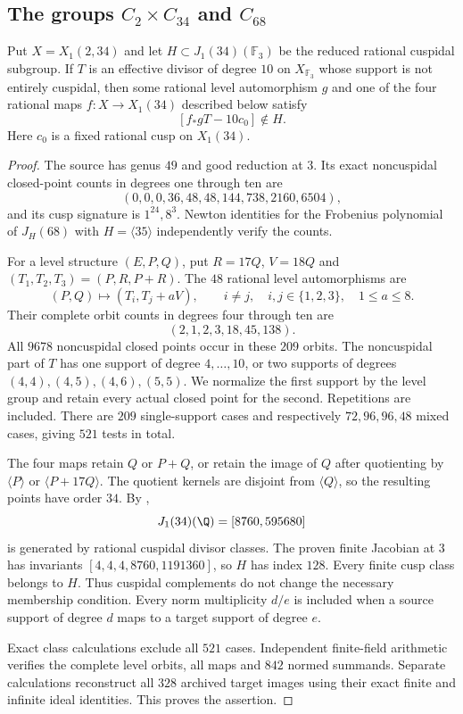 \subsection{The groups $C_2\times C_{34}$ and $C_{68}$}

\begin{lemma}\label{lem:decic234-finite-sieve}
Put $X=X_1(2,34)$ and let $H\subset J_1(34)(\mathbb F_3)$ be the
reduced rational cuspidal subgroup. If $T$ is an effective divisor
of degree $10$ on $X_{\mathbb F_3}$ whose support is not entirely cuspidal, then
some rational level automorphism $g$ and one of the four rational
maps $f:X\to X_1(34)$ described below satisfy
\[
 [f_*gT-10c_0]\notin H.
\]
Here $c_0$ is a fixed rational cusp on $X_1(34)$.
\end{lemma}
\begin{proof}
The source has genus $49$ and good reduction at $3$.
Its exact noncuspidal closed-point counts in degrees one through ten are
\[
 (0,0,0,36,48,48,144,738,2160,6504),
\]
and its cusp signature is $1^{24},8^3$.
Newton identities for the Frobenius polynomial of
$J_H(68)$ with $H=\langle35\rangle$ independently verify the counts.

For a level structure $(E,P,Q)$, put $R=17Q$, $V=18Q$ and
$(T_1,T_2,T_3)=(P,R,P+R)$.
The $48$ rational level automorphisms are
\[
 (P,Q)\longmapsto(T_i,T_j+aV),\qquad i\ne j,\quad
 i,j\in\{1,2,3\},\quad 1\leq a\leq8.
\]
Their complete orbit counts in degrees four through ten are
\[
 (2,1,2,3,18,45,138).
\]
All $9678$ noncuspidal closed points occur in these $209$ orbits.
The noncuspidal part of $T$ has one support of degree $4,\ldots,10$,
or two supports of degrees $(4,4),(4,5),(4,6),(5,5)$.
We normalize the first support by the level group and retain every
actual closed point for the second. Repetitions are included.
There are $209$ single-support cases and respectively
$72,96,96,48$ mixed cases, giving $521$ tests in total.

The four maps retain $Q$ or $P+Q$, or retain the image of $Q$
after quotienting by $\langle P\rangle$ or
$\langle P+17Q\rangle$. The quotient kernels are disjoint from
$\langle Q\rangle$, so the resulting points have order $34$.
By \cite[Theorem~4.13 and Table~2]{DEHMZ},
\[
 J_1(34)(\Q)=[8760,595680]
\]
is generated by rational cuspidal divisor classes.
The proven finite Jacobian at $3$ has invariants
$[4,4,4,8760,1191360]$, so $H$ has index $128$.
Every finite cusp class belongs to $H$.
Thus cuspidal complements do not change the necessary membership
condition. Every norm multiplicity $d/e$ is included when a
source support of degree $d$ maps to a target support of degree $e$.

Exact class calculations exclude all $521$ cases.
Independent finite-field arithmetic verifies the complete level
orbits, all maps and $842$ normed summands.
Separate calculations reconstruct all $328$ archived target images
using their exact finite and infinite ideal identities.
This proves the assertion.
\end{proof}

